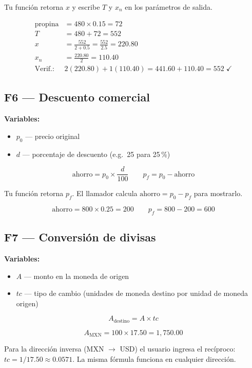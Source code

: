 \documentclass[12pt, oneside]{article}
\begin{document}
Tu función retorna $x$ y escribe $T$ y $x_n$ en los parámetros de salida.

\begin{ejemplo}
  \begin{align*}
    \text{propina} &= 480 \times 0.15 = 72 \\
    T &= 480 + 72 = 552 \\
    x &= \frac{552}{2 + 0.5} = \frac{552}{2.5} = 220.80 \\
    x_n &= \frac{220.80}{2} = 110.40 \\
    \text{Verif.:}\;& 2(220.80) + 1(110.40) = 441.60 + 110.40 = 552 \;\checkmark
  \end{align*}
\end{ejemplo}

\subsection{F6 — Descuento comercial}

\textbf{Variables:}
\begin{itemize}
  \item $p_0$ — precio original
  \item $d$ — porcentaje de descuento (e.g.\ 25 para 25\,\%)
\end{itemize}

\[
  \text{ahorro} = p_0 \times \frac{d}{100}
  \qquad
  p_f = p_0 - \text{ahorro}
\]

Tu función retorna $p_f$.  El llamador calcula $\text{ahorro} = p_0 - p_f$
para mostrarlo.

\begin{ejemplo}
  \[
    \text{ahorro} = 800 \times 0.25 = 200
    \qquad
    p_f = 800 - 200 = 600
  \]
\end{ejemplo}

\subsection{F7 — Conversión de divisas}

\textbf{Variables:}
\begin{itemize}
  \item $A$ — monto en la moneda de origen
  \item $tc$ — tipo de cambio (unidades de moneda destino por unidad de
        moneda origen)
\end{itemize}

\[
  A_{\text{destino}} = A \times tc
\]

\begin{ejemplo}
  \[
    A_{\text{MXN}} = 100 \times 17.50 = 1{,}750.00
  \]
\end{ejemplo}

\begin{consejo}
  Para la dirección inversa (MXN $\to$ USD) el usuario ingresa el recíproco:
  $tc = 1/17.50 \approx 0.0571$.  La misma fórmula funciona en cualquier
  dirección.
\end{consejo}
\end{document}
